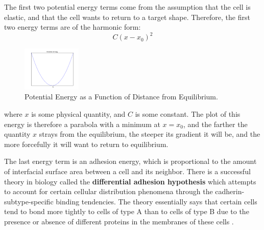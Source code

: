 The first two potential energy terms come from the assumption that the cell is elastic, and that the cell wants to return to a target shape. Therefore, the first two energy terms are of the harmonic form: 
\begin{equation}
C(x-x_0)^2
\end{equation}
\begin{figure}
\centering
\includegraphics[width=0.25\textwidth]{../diagrams/parabola.png}
\caption{Potential Energy as a Function of Distance from Equilibrium.}
\label{fig:pe}
\end{figure}
where $x$ is some physical quantity, and $C$ is some constant. The plot of this energy is therefore a parabola with a minimum at $x =  x_0$, and the farther the quantity $x$ strays from the equilibrium, the steeper its gradient it will be, and the more forcefully it will want to return to equilibrium. 

The last energy term is an adhesion energy, which is proportional to the amount of interfacial surface area between a cell and its neighbor. There is a successful theory in biology called the \textbf{differential adhesion hypothesis} which attempts to account for certain cellular distribution phenomena through the cadherin-subtype-specific binding tendencies. The theory essentially says that certain cells tend to bond more tightly to cells of type A than to cells of type B due to the presence or absence of different proteins in the membranes of these cells  \cite{DA}.

